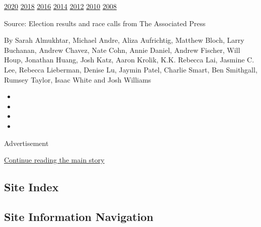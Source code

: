 \href{https://www.nytimes3xbfgragh.onion/interactive/2020/08/04/us/elections/results-michigan-primary-elections.html?action=click\&module=ELEX_results\&pgtype=Interactive\&region=PastResultsFooter}{2020}
\href{https://www.nytimes3xbfgragh.onion/interactive/2018/11/06/us/elections/results-michigan-elections.html?action=click\&module=ELEX_results\&pgtype=Interactive\&region=PastResultsFooter}{2018}
\href{https://www.nytimes3xbfgragh.onion/elections/2016/results/michigan?action=click\&module=ELEX_results\&pgtype=Interactive\&region=PastResultsFooter}{2016}
\href{https://www.nytimes3xbfgragh.onion/elections/2014/michigan-elections?action=click\&module=ELEX_results\&pgtype=Interactive\&region=PastResultsFooter}{2014}
\href{https://www.nytimes3xbfgragh.onion/elections/2012/results/states/michigan.html?action=click\&module=ELEX_results\&pgtype=Interactive\&region=PastResultsFooter}{2012}
\href{https://www.nytimes3xbfgragh.onion/elections/2010/results/michigan.html?action=click\&module=ELEX_results\&pgtype=Interactive\&region=PastResultsFooter}{2010}
\href{https://www.nytimes3xbfgragh.onion/elections/2008/results/states/michigan.html?action=click\&module=ELEX_results\&pgtype=Interactive\&region=PastResultsFooter}{2008}

Source: Election results and race calls from The Associated Press

By Sarah Almukhtar, Michael Andre, Aliza Aufrichtig, Matthew Bloch,
Larry Buchanan, Andrew Chavez, Nate Cohn, Annie Daniel, Andrew Fischer,
Will Houp, Jonathan Huang, Josh Katz, Aaron Krolik, K.K. Rebecca Lai,
Jasmine C. Lee, Rebecca Lieberman, Denise Lu, Jaymin Patel, Charlie
Smart, Ben Smithgall, Rumsey Taylor, Isaac White and Josh Williams

\begin{itemize}
\item
\item
\item
\item
\end{itemize}

Advertisement

\protect\hyperlink{after-bottom}{Continue reading the main story}

\hypertarget{site-index}{%
\subsection{Site Index}\label{site-index}}

\hypertarget{site-information-navigation}{%
\subsection{Site Information
Navigation}\label{site-information-navigation}}

